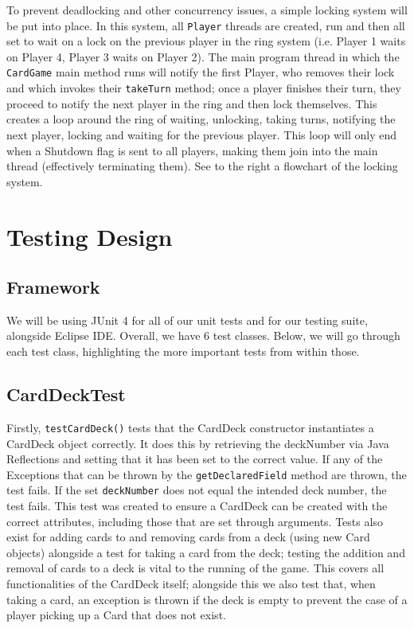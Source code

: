 \documentclass[a4paper, 11pt] {article}
\begin{document}
To prevent deadlocking and other concurrency issues, a simple locking system will be put into place. In this system, all \texttt{Player} threads are created, run and then all set to wait on a lock on the previous player in the ring system (i.e. Player 1 waits on Player 4, Player 3 waits on Player 2). The main program thread in which the \texttt{CardGame} main method runs will notify the first Player, who removes their lock and which invokes their \texttt{takeTurn} method; once a player finishes their turn, they proceed to notify the next player in the ring and then lock themselves. This creates a loop around the ring of waiting, unlocking, taking turns, notifying the next player, locking and waiting for the previous player. This loop will only end when a Shutdown flag is sent to all players, making them join into the main thread (effectively terminating them). See to the right a flowchart of the locking system.


\pagebreak
\section*{Testing Design}
\subsection*{Framework}
We will be using JUnit 4 for all of our unit tests and for our testing suite, alongside Eclipse IDE. Overall, we have 6 test classes. Below, we will go through each test class, highlighting the more important tests from within those.

\subsection*{CardDeckTest}
Firstly, \texttt{testCardDeck()} tests that the CardDeck constructor instantiates a CardDeck object correctly. It does this by retrieving the deckNumber via Java Reflections and setting that it has been set to the correct value. If any of the Exceptions that can be thrown by the \texttt{getDeclaredField} method are thrown, the test fails. If the set \texttt{deckNumber} does not equal the intended deck number, the test fails. This test was created to ensure a CardDeck can be created with the correct attributes, including those that are set through arguments. Tests also exist for adding cards to and removing cards from a deck (using new Card objects) alongside a test for taking a card from the deck; testing the addition and removal of cards to a deck is vital to the running of the game. This covers all functionalities of the CardDeck itself; alongside this we also test that, when taking a card, an exception is thrown if the deck is empty to prevent the case of a player picking up a Card that does not exist.
\end{document}
